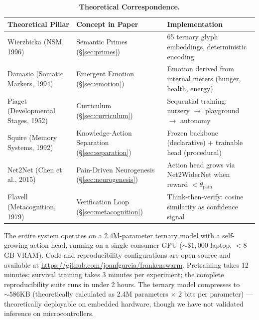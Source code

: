 \documentclass{article}
\begin{document}
\begin{table}[h]
\centering
\caption{\textbf{Theoretical Correspondence.}}
\label{tab:correspondence}
\begin{tabularx}{\textwidth}{p{4.2cm} p{3.8cm} X}
\toprule
\textbf{Theoretical Pillar} & \textbf{Concept in Paper} & \textbf{Implementation} \\
\midrule
Wierzbicka (NSM, 1996) \cite{wierzbicka1996semantics} & Semantic Primes (\S\ref{sec:primes}) & 65 ternary glyph embeddings, deterministic encoding \\
Damasio (Somatic Markers, 1994) \cite{damasio1994descartes} & Emergent Emotion (\S\ref{sec:emotion}) & Emotion derived from internal meters (hunger, health, energy) \\
Piaget (Developmental Stages, 1952) \cite{piaget1952origins} & Curriculum (\S\ref{sec:curriculum}) & Sequential training: nursery $\rightarrow$ playground $\rightarrow$ autonomy \\
Squire (Memory Systems, 1992) \cite{squire1992declarative} & Knowledge-Action Separation (\S\ref{sec:separation}) & Frozen backbone (declarative) + trainable head (procedural) \\
Net2Net (Chen et al., 2015) \cite{chen2015net2net} & Pain-Driven Neurogenesis (\S\ref{sec:neurogenesis}) & Action head grows via Net2WiderNet when reward $< \theta_{\text{pain}}$ \\
Flavell (Metacognition, 1979) \cite{flavell1979metacognition} & Verification Loop (\S\ref{sec:metacognition}) & Think-then-verify: cosine similarity as confidence signal \\
\bottomrule
\end{tabularx}
\end{table}

The entire system operates on a 2.4M-parameter ternary model with a self-growing action head, running on a single consumer GPU ($\sim\$1,000$ laptop, $<8$GB VRAM). Code and reproducibility configurations are open-source and available at \url{https://github.com/joanfgarcia/frankenswarm}. Pretraining takes 12 minutes; survival training takes 3 minutes per experiment; the complete reproducibility suite runs in under 2 hours. The ternary model compresses to $\sim 586$KB (theoretically calculated as 2.4M parameters $\times$ 2 bits per parameter) --- theoretically deployable on embedded hardware, though we have not validated inference on microcontrollers. 
\end{document}
